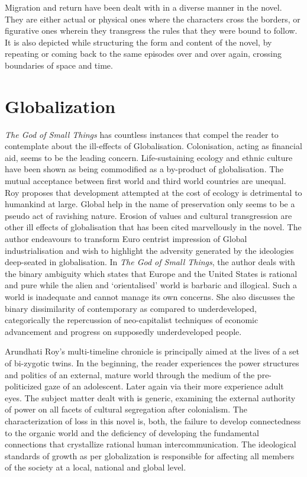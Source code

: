 Migration and return have been dealt with in a diverse manner in the novel. They are either actual or physical ones where the characters cross the borders, or figurative ones wherein they transgress the rules that they were bound to follow. It is also depicted while structuring the form and content of the novel, by repeating or coming back to the same episodes over and over again, crossing boundaries of space and time.

\section{Globalization}

\emph{The God of Small Things} has countless instances that compel the reader to contemplate about the ill-effects of Globalisation. Colonisation, acting as financial aid, seems to be the leading concern. Life-sustaining ecology and ethnic culture have been shown as being commodified as a by-product of globalisation. The mutual acceptance between first world and third world countries are unequal. Roy proposes that development attempted at the cost of ecology is detrimental to humankind at large. Global help in the name of preservation only seems to be a pseudo act of ravishing nature. Erosion of values and cultural transgression are other ill effects of globalisation that has been cited marvellously in the novel. The author endeavours to transform Euro centrist impression of Global industrialisation and wish to highlight the adversity generated by the ideologies deep-seated in globalisation. In \emph{The God of Small Things}, the author deals with the binary ambiguity which states that Europe and the United States is rational and pure while the alien and `orientalised' world is barbaric and illogical. Such a world is inadequate and cannot manage its own concerns. She also discusses the binary dissimilarity of contemporary as compared to underdeveloped, categorically the repercussion of neo-capitalist techniques of economic advancement and progress on supposedly underdeveloped people. 

Arundhati Roy's multi-timeline chronicle is principally aimed at the lives of a set of bi-zygotic twins. In the beginning, the reader experiences the power structures and politics of an external, mature world through the medium of the pre-politicized gaze of an adolescent. Later again via their more experience adult eyes. The subject matter dealt with is generic, examining the external authority of power on all facets of cultural segregation after colonialism. The characterization of loss in this novel is, both, the failure to develop connectedness to the organic world and the deficiency of developing the fundamental connections that crystallize rational human intercommunication. The ideological standards of growth as per globalization is responsible for affecting all members of the society at a local, national and global level.

